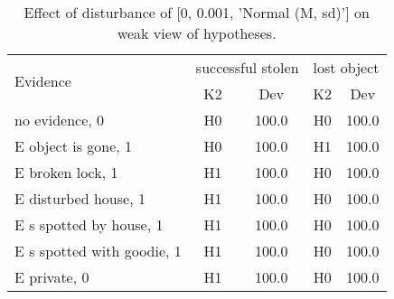 \begin{table}\begin{tabular}{l|cc|cc}\toprule\multirow{2}{*}{Evidence} & \multicolumn{2}{c}{successful stolen}& \multicolumn{2}{c}{lost object}\\& {K2} & {Dev}& {K2} & {Dev}\\\midrule
no evidence, 0 & H0&100.0&H0&100.0\\E object is gone, 1 & H0&100.0&H1&100.0\\E broken lock, 1 & H1&100.0&H0&100.0\\E disturbed house, 1 & H1&100.0&H0&100.0\\E s spotted by house, 1 & H1&100.0&H0&100.0\\E s spotted with goodie, 1 & H1&100.0&H0&100.0\\E private, 0 & H1&100.0&H0&100.0\\\bottomrule\end{tabular}\caption{Effect of disturbance of [0, 0.001, 'Normal (M, sd)'] on weak view of hypotheses.}\end{table}